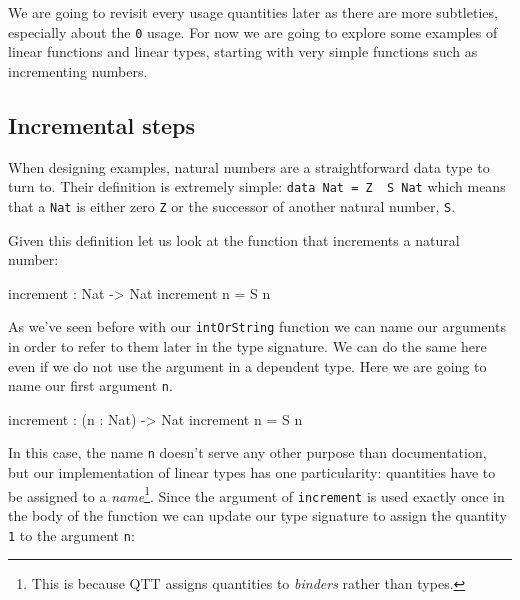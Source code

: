 \documentclass[
]{article}
\newenvironment{Shaded}{}{}
\newcommand{\DataTypeTok}[1]{\textcolor[rgb]{0.56,0.13,0.00}{#1}}
\newcommand{\NormalTok}[1]{#1}
\newcommand{\OperatorTok}[1]{\textcolor[rgb]{0.40,0.40,0.40}{#1}}
\newcommand{\OtherTok}[1]{\textcolor[rgb]{0.00,0.44,0.13}{#1}}
\begin{document}
We are going to revisit every usage quantities later as there are more
subtleties, especially about the \texttt{0} usage. For now we are going
to explore some examples of linear functions and linear types, starting
with very simple functions such as incrementing numbers.

\hypertarget{incremental-steps}{%
\subsection{Incremental steps}\label{incremental-steps}}

When designing examples, natural numbers are a straightforward data type
to turn to. Their definition is extremely simple:
\texttt{data\ Nat\ =\ Z\ \textbar{}\ S\ Nat} which means that a
\texttt{Nat} is either zero \texttt{Z} or the successor of another
natural number, \texttt{S}.

Given this definition let us look at the function that increments a
natural number:

\begin{Shaded}
\begin{Highlighting}[]
\NormalTok{increment }\OperatorTok{:} \DataTypeTok{Nat} \OtherTok{{-}\textgreater{}} \DataTypeTok{Nat}
\NormalTok{increment n }\OtherTok{=} \DataTypeTok{S}\NormalTok{ n}
\end{Highlighting}
\end{Shaded}

As we've seen before with our \texttt{intOrString} function we can name
our arguments in order to refer to them later in the type signature. We
can do the same here even if we do not use the argument in a dependent
type. Here we are going to name our first argument \texttt{n}.

\begin{Shaded}
\begin{Highlighting}[]
\NormalTok{increment }\OperatorTok{:}\NormalTok{ (n }\OperatorTok{:} \DataTypeTok{Nat}\NormalTok{) }\OtherTok{{-}\textgreater{}} \DataTypeTok{Nat}
\NormalTok{increment n }\OtherTok{=} \DataTypeTok{S}\NormalTok{ n}
\end{Highlighting}
\end{Shaded}

In this case, the name \texttt{n} doesn't serve any other purpose than
documentation, but our implementation of linear types has one
particularity: quantities have to be assigned to a
\emph{name}\footnote{This is because QTT assigns quantities to
  \emph{binders} rather than types.}. Since the argument of
\texttt{increment} is used exactly once in the body of the function we
can update our type signature to assign the quantity \texttt{1} to the
argument \texttt{n}:
\end{document}
